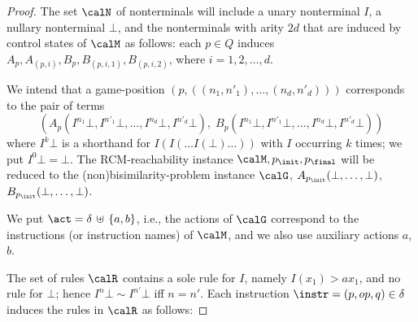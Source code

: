 \documentclass[a4paper,11pt]{article}
\begin{document}
\begin{proof}
The set $\calN$ of nonterminals will include 
a unary nonterminal $I$, a nullary nonterminal $\bot$, and the
nonterminals with arity  $2d$ that are induced by control states of
$\calM$ as follows:
each $p\in Q$ induces 
$A_p, A_{(p,i)}, B_p, B_{(p,i,1)},
B_{(p,i,2)}$, where $i=1,2,\dots,d$.

We intend that 
a game-position $(p,((n_1,n'_1),\dots,(n_d,n'_d)))$ corresponds to the
pair of terms 
\begin{equation}\label{eq:pairposition}
\left(A_p(I^{n_1}\bot, I^{n'_1}\bot,\dots, I^{n_d}\bot,
I^{n'_d}\bot), \;B_p(I^{n_1}\bot, I^{n'_1}\bot,\dots, I^{n_d}\bot,
I^{n'_d}\bot)\right)
\end{equation}
where $I^k\bot$ is a shorthand for 
$I(I(\dots I(\bot)\dots))$ with $I$ occurring $k$ times; we put
$I^0\bot=\bot$.
The RCM-reachability instance $\calM, p_\init, p_\final$ will be
reduced to the (non)bisimilarity-problem instance $\calG$, 
$A_{p_\init}(\bot,\dots,\bot)$, $B_{p_\init}(\bot,\dots,\bot)$.


We put $\act=\delta\,\uplus\,\{a,b\}$, i.e., the actions of
$\calG$ correspond to the instructions (or instruction names)
of $\calM$, and we also use
auxiliary actions $a$, $b$.

The set of rules $\calR$ contains a sole rule for $I$, namely
$I(x_1)\gt{a}x_1$, and no rule for $\bot$;
hence $I^n\bot\sim I^{n'}\bot$ iff $n=n'$.
Each instruction   $\instr=(p,op,q)\in\delta$ induces the rules in $\calR$ as
follows:


\end{proof}
\end{document}
